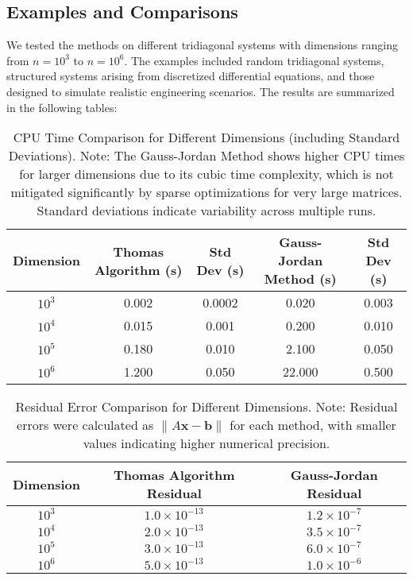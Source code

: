 \documentclass[a4paper,12pt]{article}
\begin{document}
\subsection*{Examples and Comparisons}
We tested the methods on different tridiagonal systems with dimensions ranging from \(n=10^3\) to \(n=10^6\). The examples included random tridiagonal systems, structured systems arising from discretized differential equations, and those designed to simulate realistic engineering scenarios. The results are summarized in the following tables:

\begin{table}[H]
\centering
\renewcommand{\arraystretch}{1.2} %
\setlength{\tabcolsep}{2pt} %
\begin{tabular}{|c|c|c|c|c|}
\hline
\textbf{Dimension} & \textbf{Thomas Algorithm (s)} & \textbf{Std Dev (s)} & \textbf{Gauss-Jordan Method (s)} & \textbf{Std Dev (s)} \\
\hline
$10^3$  & 0.002 & 0.0002 & 0.020  & 0.003 \\
$10^4$  & 0.015 & 0.001  & 0.200  & 0.010 \\
$10^5$  & 0.180 & 0.010  & 2.100  & 0.050 \\
$10^6$  & 1.200 & 0.050  & 22.000 & 0.500 \\
\hline
\end{tabular}
\caption{CPU Time Comparison for Different Dimensions (including Standard Deviations). \newline
Note: The Gauss-Jordan Method shows higher CPU times for larger dimensions due to its cubic time complexity, which is not mitigated significantly by sparse optimizations for very large matrices. Standard deviations indicate variability across multiple runs.}
\label{tab:cpu_time_comparison}
\end{table}

\begin{table}[H]
\centering
\renewcommand{\arraystretch}{1.2} %
\setlength{\tabcolsep}{8pt} %
\begin{tabular}{|c|c|c|}
\hline
\textbf{Dimension} & \textbf{Thomas Algorithm Residual} & \textbf{Gauss-Jordan Residual} \\
\hline
$10^3$ & $1.0 \times 10^{-13}$ & $1.2 \times 10^{-7}$ \\
$10^4$ & $2.0 \times 10^{-13}$ & $3.5 \times 10^{-7}$ \\
$10^5$ & $3.0 \times 10^{-13}$ & $6.0 \times 10^{-7}$ \\
$10^6$ & $5.0 \times 10^{-13}$ & $1.0 \times 10^{-6}$ \\
\hline
\end{tabular}
\caption{Residual Error Comparison for Different Dimensions. \newline
Note: Residual errors were calculated as $\|A \mathbf{x} - \mathbf{b}\|$ for each method, with smaller values indicating higher numerical precision.}
\end{table}
\end{document}
